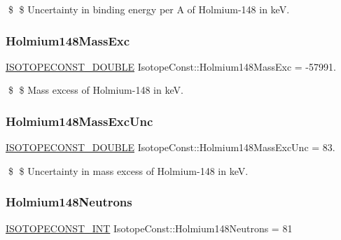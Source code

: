 \$ \$ Uncertainty in binding energy per A of Holmium-\/148 in keV. \mbox{\label{group___isotope_const-_holmium-_ho148_ga5bd053195b232d7478e85d92e4d169d9}} 
\subsubsection{\texorpdfstring{Holmium148\+Mass\+Exc}{Holmium148MassExc}}
{\footnotesize\ttfamily \mbox{\hyperlink{group___isotope_const-_macros_ga8f45a7272ce02c0b4c65c44636ed719a}{I\+S\+O\+T\+O\+P\+E\+C\+O\+N\+S\+T\+\_\+\+D\+O\+U\+B\+LE}} Isotope\+Const\+::\+Holmium148\+Mass\+Exc = -\/57991.}

\$ \$ Mass excess of Holmium-\/148 in keV. \mbox{\label{group___isotope_const-_holmium-_ho148_gaa727b2058f7799d6ca73425f1622f0e2}} 
\subsubsection{\texorpdfstring{Holmium148\+Mass\+Exc\+Unc}{Holmium148MassExcUnc}}
{\footnotesize\ttfamily \mbox{\hyperlink{group___isotope_const-_macros_ga8f45a7272ce02c0b4c65c44636ed719a}{I\+S\+O\+T\+O\+P\+E\+C\+O\+N\+S\+T\+\_\+\+D\+O\+U\+B\+LE}} Isotope\+Const\+::\+Holmium148\+Mass\+Exc\+Unc = 83.}

\$ \$ Uncertainty in mass excess of Holmium-\/148 in keV. \mbox{\label{group___isotope_const-_holmium-_ho148_ga480c9c991b4420bebe08f81dcda26c82}} 
\subsubsection{\texorpdfstring{Holmium148\+Neutrons}{Holmium148Neutrons}}
{\footnotesize\ttfamily \mbox{\hyperlink{group___isotope_const-_macros_ga5f18360b3e99483a35c32d789e62621c}{I\+S\+O\+T\+O\+P\+E\+C\+O\+N\+S\+T\+\_\+\+I\+NT}} Isotope\+Const\+::\+Holmium148\+Neutrons = 81}

